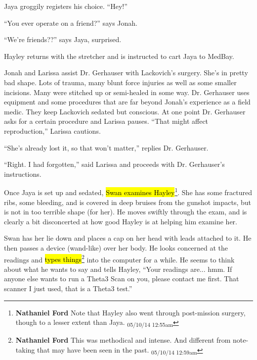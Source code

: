 Jaya groggily registers his choice. ``Hey!''

``You ever operate on a friend?'' says Jonah.

``We're friends??'' says Jaya, surprised.

Hayley returns with the stretcher and is instructed to cart Jaya to MedBay.





Jonah and Larissa assist Dr. Gerhauser with Lackovich's surgery.  She's in pretty bad shape.  Lots of trauma, many blunt force injuries as well as some smaller incisions.  Many were stitched up or semi-healed in some way.   Dr. Gerhauser uses equipment and some procedures that are far beyond Jonah's experience as a field medic.  They keep Lackovich sedated but conscious.  At one point Dr. Gerhauser asks for a certain procedure and Larissa pauses.  ``That might affect reproduction,'' Larissa cautions.  

``She's already lost it, so that won't matter,'' replies Dr. Gerhauser.

``Right.  I had forgotten,'' said Larissa and proceeds with Dr. Gerhauser's instructions.



Once Jaya is set up and sedated, \hl{Swan examines Hayley}\footnote{\textbf{Nathaniel Ford }Note that Hayley also went through post-mission surgery, though to a lesser extent than Jaya. \textsubscript{05/10/14 12:55am}}.  She has some fractured ribs, some bleeding, and is covered in deep bruises from the gunshot impacts, but is not in too terrible shape (for her).  He moves swiftly through the exam, and is clearly a bit disconcerted at how good Hayley is at helping him examine her.



Swan has her lie down and places a cap on her head with leads attached to it.  He then passes a device (wand-like) over her body.  He looks concerned at the readings and \hl{types things}\footnote{\textbf{Nathaniel Ford }This was methodical and intense. And different from note-taking that may have been seen in the past. \textsubscript{05/10/14 12:59am}} into the computer for a while.  He seems to think about what he wants to say and tells Hayley, ``Your readings are... hmm.  If anyone else wants to run a Theta3 Scan on you, please contact me first.  That scanner I just used, that is a Theta3 test.''

